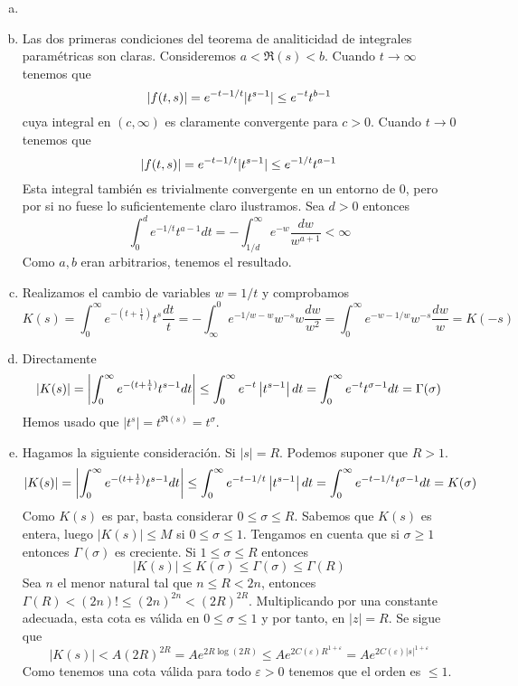 \documentclass[twoside]{article}
\begin{document}
\begin{solucion}
\begin{enumerate}[a)]
\item[]
\item Las dos primeras condiciones del teorema de analiticidad de integrales paramétricas son claras. Consideremos $a<\Re(s)<b$. Cuando $t\to \infty$ tenemos que
$$
\left\lvert f(t,s)\right\rvert = e^{-t -1/t}|t^{s-1}| \leq e^{-t}t^{b-1}
$$
cuya integral en $(c,\infty)$ es claramente convergente para $c>0$. Cuando $t\to 0$ tenemos que
$$
\left\lvert f(t,s)\right\rvert = e^{-t-1/t}|t^{s-1}| \leq e^{-1/t}t^{a-1}
$$
Esta integral también es trivialmente convergente en un entorno de 0, pero por si no fuese lo suficientemente claro ilustramos. Sea $d>0$ entonces
$$
\int_0^d e^{-1/t}t^{a-1} dt = -\int_{1/d}^\infty e^{-w}\frac{dw}{w^{a+1}}<\infty
$$
Como $a,b$ eran arbitrarios, tenemos el resultado.
\item Realizamos el cambio de variables $w=1/t$ y comprobamos
$$
K(s) =\int_0^\infty e^{-(t+\frac{1}{t})}t^s\frac{dt}{t} = - \int_\infty^0 e^{-1/w-w}w^{-s}w \frac{dw}{w^2} = \int_0^\infty e^{-w-1/w}w^{-s}\frac{dw}{w} = K(-s)
$$
\item Directamente
$$
|K(s)| = \left\lvert\int_0^\infty e^{-(t+\frac{1}{t})}t^{s-1}dt\right\rvert\leq \int_0^\infty e^{-t}\left\lvert t^{s-1}\right\rvert dt = \int_0^\infty e^{-t}{t^{\sigma-1}}dt = \Gamma(\sigma)
$$
Hemos usado que $|t^{s}| = t^{\Re(s)} = t^\sigma$.
\item Hagamos la siguiente consideración. Si $|s|= R$. Podemos suponer que $R>1$.
$$
|K(s)| = \left\lvert\int_0^\infty e^{-(t+\frac{1}{t})}t^{s-1}dt\right\rvert\leq \int_0^\infty e^{-t-1/t}\left\lvert t^{s-1}\right\rvert dt = \int_0^\infty e^{-t-1/t}{t^{\sigma-1}}dt = K(\sigma)
$$
Como $K(s)$ es par, basta considerar $0\leq \sigma \leq R$. Sabemos que $K(s)$ es entera, luego $|K(s)| \leq M$ si $0\leq \sigma \leq 1$. Tengamos en cuenta que si $\sigma \geq 1$ entonces $\Gamma(\sigma)$ es creciente. Si $1\leq \sigma \leq R$ entonces 
$$|K(s)|\leq K(\sigma)\leq \Gamma(\sigma) \leq \Gamma(R)$$ Sea $n$ el menor natural tal que $n\leq R < 2n$, entonces $\Gamma(R) < (2n)! \leq (2n)^{2n} < (2R)^{2R}$. Multiplicando por una constante adecuada, esta cota es válida en $0\leq \sigma \leq 1$ y por tanto, en $|z|=R$. Se sigue que
$$
|K(s)| < A(2R)^{2R} = Ae^{2R\log(2R)} \leq Ae^{2C(\varepsilon)R^{1+\varepsilon}}= Ae^{2C(\varepsilon)|s|^{1+\varepsilon}}
$$
Como tenemos una cota válida para todo $\varepsilon>0$ tenemos que el orden es $\leq 1$.
\end{enumerate}
\end{solucion}
\newpage
\end{document}
